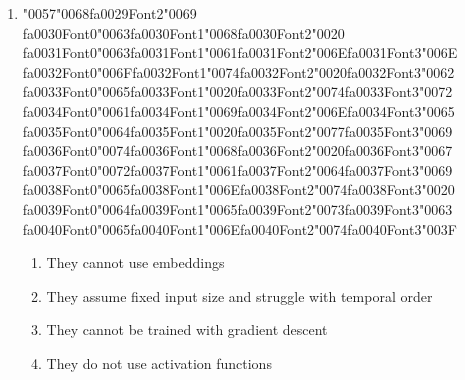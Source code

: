 \documentclass[12pt]{article}
\begin{document}
\begin{enumerate}[label=Q\arabic*.]
\begin{enumerate}[label=(\Alph*)]
    \item To prevent the gradients from exploding
    \item To increase the speed of the training process
    \item To allow the model to handle variable-length sequences
\end{enumerate}
\item {\char"0057}{\char"0068}{\csname fa0029Font2\endcsname\char"0069} {\csname fa0030Font0\endcsname\char"0063}{\csname fa0030Font1\endcsname\char"0068}{\csname fa0030Font2\endcsname\char"0020} {\csname fa0031Font0\endcsname\char"0063}{\csname fa0031Font1\endcsname\char"0061}{\csname fa0031Font2\endcsname\char"006E}{\csname fa0031Font3\endcsname\char"006E} {\csname fa0032Font0\endcsname\char"006F}{\csname fa0032Font1\endcsname\char"0074}{\csname fa0032Font2\endcsname\char"0020}{\csname fa0032Font3\endcsname\char"0062} {\csname fa0033Font0\endcsname\char"0065}{\csname fa0033Font1\endcsname\char"0020}{\csname fa0033Font2\endcsname\char"0074}{\csname fa0033Font3\endcsname\char"0072} {\csname fa0034Font0\endcsname\char"0061}{\csname fa0034Font1\endcsname\char"0069}{\csname fa0034Font2\endcsname\char"006E}{\csname fa0034Font3\endcsname\char"0065} {\csname fa0035Font0\endcsname\char"0064}{\csname fa0035Font1\endcsname\char"0020}{\csname fa0035Font2\endcsname\char"0077}{\csname fa0035Font3\endcsname\char"0069} {\csname fa0036Font0\endcsname\char"0074}{\csname fa0036Font1\endcsname\char"0068}{\csname fa0036Font2\endcsname\char"0020}{\csname fa0036Font3\endcsname\char"0067} {\csname fa0037Font0\endcsname\char"0072}{\csname fa0037Font1\endcsname\char"0061}{\csname fa0037Font2\endcsname\char"0064}{\csname fa0037Font3\endcsname\char"0069} {\csname fa0038Font0\endcsname\char"0065}{\csname fa0038Font1\endcsname\char"006E}{\csname fa0038Font2\endcsname\char"0074}{\csname fa0038Font3\endcsname\char"0020} {\csname fa0039Font0\endcsname\char"0064}{\csname fa0039Font1\endcsname\char"0065}{\csname fa0039Font2\endcsname\char"0073}{\csname fa0039Font3\endcsname\char"0063} {\csname fa0040Font0\endcsname\char"0065}{\csname fa0040Font1\endcsname\char"006E}{\csname fa0040Font2\endcsname\char"0074}{\csname fa0040Font3\endcsname\char"003F}
\begin{enumerate}[label=(\Alph*)]
    \item They cannot use embeddings
    \item They assume fixed input size and struggle with temporal order
    \item They cannot be trained with gradient descent
    \item They do not use activation functions

\end{enumerate}
\end{enumerate}
\end{document}
